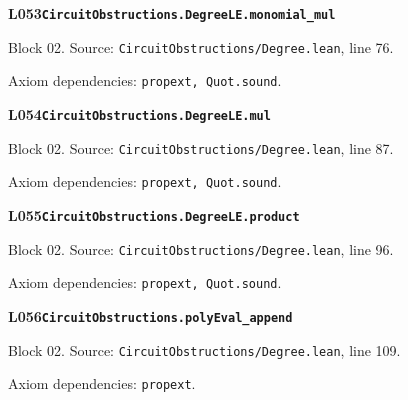 \begin{minipage}{\linewidth}
\hypertarget{L053}{}
{\small\sffamily\bfseries\color{ink}L053\quad\nolinkurl{CircuitObstructions.DegreeLE.monomial_mul}}\par
{\scriptsize\sffamily\color{muted}Block 02. Source: \nolinkurl{CircuitObstructions/Degree.lean}, line 76.}\par
{}
{\scriptsize\sffamily\color{muted}Axiom dependencies: \nolinkurl{propext, Quot.sound}.}
\end{minipage}\par\medskip
\begin{minipage}{\linewidth}
\hypertarget{L054}{}
{\small\sffamily\bfseries\color{ink}L054\quad\nolinkurl{CircuitObstructions.DegreeLE.mul}}\par
{\scriptsize\sffamily\color{muted}Block 02. Source: \nolinkurl{CircuitObstructions/Degree.lean}, line 87.}\par
{}
{\scriptsize\sffamily\color{muted}Axiom dependencies: \nolinkurl{propext, Quot.sound}.}
\end{minipage}\par\medskip
\begin{minipage}{\linewidth}
\hypertarget{L055}{}
{\small\sffamily\bfseries\color{ink}L055\quad\nolinkurl{CircuitObstructions.DegreeLE.product}}\par
{\scriptsize\sffamily\color{muted}Block 02. Source: \nolinkurl{CircuitObstructions/Degree.lean}, line 96.}\par
{}
{\scriptsize\sffamily\color{muted}Axiom dependencies: \nolinkurl{propext, Quot.sound}.}
\end{minipage}\par\medskip
\begin{minipage}{\linewidth}
\hypertarget{L056}{}
{\small\sffamily\bfseries\color{ink}L056\quad\nolinkurl{CircuitObstructions.polyEval_append}}\par
{\scriptsize\sffamily\color{muted}Block 02. Source: \nolinkurl{CircuitObstructions/Degree.lean}, line 109.}\par
{}
{\scriptsize\sffamily\color{muted}Axiom dependencies: \nolinkurl{propext}.}
\end{minipage}\par\medskip

